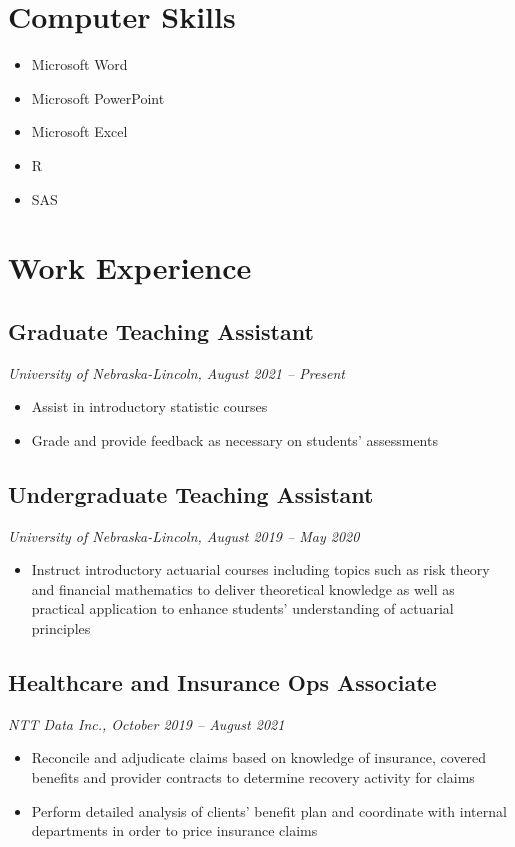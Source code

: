 \documentclass{cv_style}
\begin{document}
  \section{Computer Skills}
		\begin{itemize}
			\item Microsoft Word
			\item Microsoft PowerPoint
			\item Microsoft Excel
			\item R
			\item SAS
		\end{itemize}

	\section{Work Experience}
	  \subsection{Graduate Teaching Assistant}\textit{University of Nebraska-Lincoln, August 2021 – Present}
	      \begin{itemize}
			    \item Assist in introductory statistic courses
			    \item Grade and provide feedback as necessary on students’ assessments
	      \end{itemize}
	  \subsection{Undergraduate Teaching Assistant}\textit{University of Nebraska-Lincoln, August 2019 – May 2020}
	      \begin{itemize}
			    \item Instruct introductory actuarial courses including topics such as risk theory and financial mathematics to deliver theoretical knowledge as well as practical application to enhance students’ understanding of actuarial principles
			  \end{itemize}
    \subsection{Healthcare and Insurance Ops Associate}\textit{NTT Data Inc., October 2019 – August 2021}
        \begin{itemize}
	        \item Reconcile and adjudicate claims based on knowledge of insurance, covered benefits and provider contracts to determine recovery activity for claims
			    \item Perform detailed analysis of clients’ benefit plan and coordinate with internal departments in order to price insurance claims
		    \end{itemize}
\end{document}
